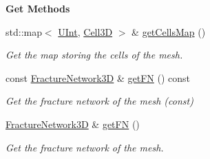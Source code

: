 \begin{Indent}{\bf Get Methods}
\begin{DoxyCompactItemize}
std\+::map$<$ \hyperlink{namespaceFVCode3D_a4bf7e328c75d0fd504050d040ebe9eda}{U\+Int}, \hyperlink{classFVCode3D_1_1Mesh3D_1_1Cell3D}{Cell3D} $>$ \& \hyperlink{classFVCode3D_1_1Mesh3D_a071c9bc9824e46729282d688ad805e57}{get\+Cells\+Map} ()
\begin{DoxyCompactList}\small\item\em Get the map storing the cells of the mesh. \end{DoxyCompactList}\item 
const \hyperlink{classFVCode3D_1_1FractureNetwork3D}{Fracture\+Network3D} \& \hyperlink{classFVCode3D_1_1Mesh3D_a6ba176804035a210ee1f73348ec04aca}{get\+FN} () const 
\begin{DoxyCompactList}\small\item\em Get the fracture network of the mesh (const) \end{DoxyCompactList}\item 
\hyperlink{classFVCode3D_1_1FractureNetwork3D}{Fracture\+Network3D} \& \hyperlink{classFVCode3D_1_1Mesh3D_a9676abae24759a4294f5d67f37b21be3}{get\+FN} ()
\begin{DoxyCompactList}\small\item\em Get the fracture network of the mesh. \end{DoxyCompactList}\end{DoxyCompactItemize}
\end{Indent}
